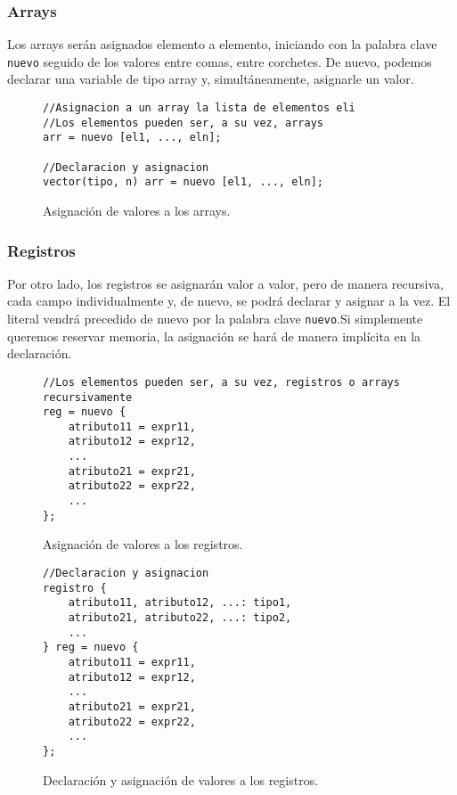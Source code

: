 \subsubsection{Arrays}
Los arrays serán asignados elemento a elemento, iniciando con la palabra clave
\lstinline{nuevo} seguido de los valores entre comas, entre corchetes. De nuevo,
podemos declarar una variable de tipo array y, simultáneamente, asignarle un
valor.
\begin{figure}[htbp]
    \centering
    \begin{lstlisting}
//Asignacion a un array la lista de elementos eli
//Los elementos pueden ser, a su vez, arrays
arr = nuevo [el1, ..., eln];

//Declaracion y asignacion
vector(tipo, n) arr = nuevo [el1, ..., eln];
    \end{lstlisting}
    \caption{Asignación de valores a los arrays.}
\end{figure}

\subsubsection{Registros}
Por otro lado, los registros se asignarán valor a valor, pero de manera
recursiva, cada campo individualmente y, de nuevo, se podrá declarar y asignar a
la vez. El literal vendrá precedido de nuevo por la palabra clave
\lstinline{nuevo}.Si simplemente queremos reservar memoria, la asignación se
hará de manera implícita en la declaración.
\begin{figure}[htbp]
    \centering
    \begin{lstlisting}
//Los elementos pueden ser, a su vez, registros o arrays recursivamente
reg = nuevo {
    atributo11 = expr11,
    atributo12 = expr12,
    ...
    atributo21 = expr21,
    atributo22 = expr22,
    ...
};
    \end{lstlisting}
    \caption{Asignación de valores a los registros.}
\end{figure}

\begin{figure}[htbp]
    \centering
    \begin{lstlisting}
//Declaracion y asignacion
registro {
    atributo11, atributo12, ...: tipo1,
    atributo21, atributo22, ...: tipo2,
    ...
} reg = nuevo {
    atributo11 = expr11,
    atributo12 = expr12,
    ...
    atributo21 = expr21,
    atributo22 = expr22,
    ...
};
    \end{lstlisting}
    \caption{Declaración y asignación de valores a los registros.}
\end{figure}

